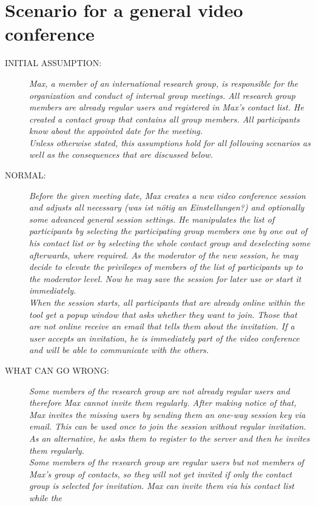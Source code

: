 \section{Scenario for a general video conference}
\begin{description}
\item[INITIAL ASSUMPTION:]
\textit{Max, a member of an international research group, is responsible for
the organization and conduct of internal group meetings. All research group members 
are already regular users and registered in Max's contact list. He created
a contact group that contains all group members. All participants know about
the appointed date for the meeting.
\\Unless otherwise stated, this assumptions
hold for all following scenarios as well as the consequences that are discussed below.}
\item[NORMAL:]
\textit{Before the given meeting date, Max creates
a new video conference session and adjusts all necessary (was ist nötig an
Einstellungen?) and optionally some advanced general session settings. He
manipulates the list of participants by selecting the participating group
members one by one out of his contact list or by selecting the whole contact
group and deselecting some afterwards, where required. As the moderator of the
new session, he may decide to elevate the privileges of members of the
list of participants up to the moderator level. Now he may save the session for
later use or start it immediately.
\\When the session starts, all participants that are already online within the
tool get a popup window that asks whether they want to join. Those that are not
online receive an email that tells them about the invitation. If a user accepts
an invitation, he is immediately part of the video conference and will be able
to communicate with the others.}
\item[WHAT CAN GO WRONG:]
\textit{Some members of the research group are not already regular users and therefore
Max cannot invite them regularly. After making notice of that, Max invites the
missing users by sending them an one-way session key via email. This can be used
once to join the session without regular invitation. As an
alternative, he asks them to register to the server and then he invites them regularly.
\\Some members of the research group are regular users but not members of Max's
group of contacts, so they will not get invited if only the contact group is
selected for invitation. Max can invite them via his contact list while the
}
\end{description}
